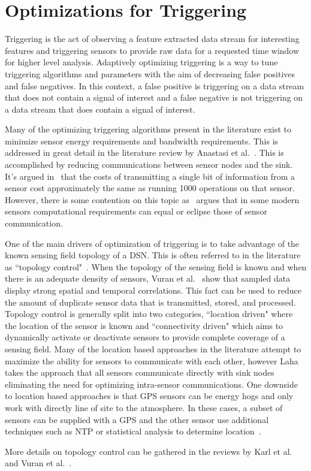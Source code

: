 \section{Optimizations for Triggering}\label{sec:optimizations-for-triggering}
Triggering is the act of observing a feature extracted data stream for interesting features and triggering sensors to provide raw data for a requested time window for higher level analysis. Adaptively optimizing triggering is a way to tune triggering algorithms and parameters with the aim of decreasing false positives and false negatives. In this context, a false positive is triggering on a data stream that does not contain a signal of interest and a false negative is not triggering on a data stream that does contain a signal of interest.

Many of the optimizing triggering algorithms present in the literature exist to minimize sensor energy requirements and bandwidth requirements. This is addressed in great detail in the literature review by Anastasi et al.~\cite{anastasi_energy_2009}. This is accomplished by reducing communications between sensor nodes and the sink. It's argued in~\cite{pottie2000wireless} that the costs of transmitting a single bit of information from a sensor cost approximately the same as running 1000 operations on that sensor. However, there is some contention on this topic as~\cite{alippi_adaptive_2010} argues that in some modern sensors computational requirements can equal or eclipse those of  sensor communication.

One of the main drivers of optimization of triggering is to take advantage of the known sensing field topology of a DSN. This is often referred to in the literature as ``topology control"~\cite{santi2005topology}. When the topology of the sensing field is known and when there is an adequate density of sensors, Vuran et al.~\cite{luan2015fog} show that sampled data display strong spatial and temporal correlations. This fact can be used to reduce the amount of duplicate sensor data that is transmitted, stored, and processed. Topology control is generally split into two categories, ``location  driven" where the location of the sensor is known and ``connectivity driven" which aims to dynamically activate or deactivate sensors to provide complete coverage of a sensing field. Many of the location based approaches in the literature attempt  to maximize the ability for sensors to communicate with each other, however Laha takes the approach that all sensors communicate directly with sink nodes eliminating the need for optimizing intra-sensor communications. One downside to location based approaches is that GPS sensors can be energy hogs and only work with directly line of site to the atmosphere. In these cases, a subset of sensors can be supplied with a GPS and the other sensor use additional techniques such as NTP or statistical analysis to determine location~\cite{langendoen2003distributed}.

More details on topology control can be gathered in the reviews by Karl et al.~\cite{karl2007protocols} and Vuran et al.~\cite{vuran2004spatio}.







